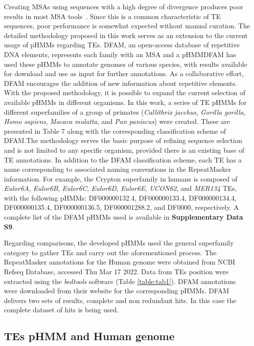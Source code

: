 \documentclass[unnumsec,webpdf,contemporary,large]{oup-authoring-template}%
\theoremstyle{thmstyleone}%
\theoremstyle{thmstyletwo}%
\theoremstyle{thmstylethree}%
\begin{document}
Creating MSAs using sequences with a high degree of divergence produces poor
results in most MSA tools~\cite{hubley_accuracy_2022}. Since this is a common
characteristic of TE sequences, poor performance is somewhat expected without
manual curation. The detailed methodology proposed in this work serves as an
extension to the current usage of pHMMs regarding TEs. DFAM, an open-access
database of repetitive DNA elements, represents each family with an MSA and a
pHMM\@ DFAM has used these pHMMs to annotate genomes of various species, with
results available for download and use as input for further annotations. As a
collaborative effort, DFAM encourages the addition of new information about
repetitive elements. With the proposed methodology, it is possible to expand the
current selection of available pHMMs in different organisms. In this work, a
series of TE pHMMs for different superfamilies of a group of primates
(\textit{Callithrix jacchus}, \textit{Gorilla gorilla}, \textit{Homo sapiens},
\textit{Macaca mulatta}, and \textit{Pan paniscus}) were created. These are
presented in Table 7 along with the corresponding classification scheme of
DFAM.\@ The methodology serves the basic purpose of refining sequence selection
and is not limited to any specific organism, provided there is an existing base
of TE annotations. In addition to the DFAM classification scheme, each TE has a
name corresponding to associated naming conventions in the RepeatMasker
information. For example, the Crypton superfamily in humans is composed of
\textit{Eulor6A}, \textit{Eulor6B}, \textit{Eulor6C}, \textit{Eulor6D},
\textit{Eulor6E}, \textit{UCON62}, and \textit{MER134} TEs, with the following
pHMMs: DF000000132.4, DF000000133.4, DF000000134.4, DF000000135.4,
DF000000136.5, DF000001288.2, and DF0000, respectively. A complete list
of the DFAM pHMMs used is available in \textbf{Supplementary Data S9}.

Regarding comparisons, the developed pHMMs used the general superfamily category
to gather TEs and carry out the aforementioned process. The RepeatMasker
annotations for the Human genome were obtained from NCBI Refseq Database,
accessed Thu Mar 17 2022. Data from TEs position were extracted using the
\textit{bedtools} software (Table \ref*{table:tab1}). DFAM annotations were downloaded from
their website for the corresponding pHMMs. DFAM delivers two sets of results,
complete and non redundant hits. In this case the complete dataset of hits is
being used.

\subsection{TEs pHMM and Human genome}\label{sec4_1}
\end{document}
